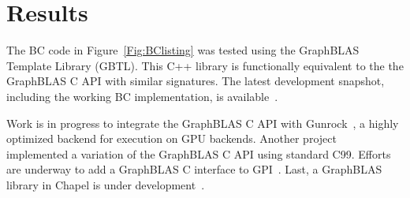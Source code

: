 \section{Results}
\label{sec:results}

The BC code in Figure~\ref{Fig:BClisting} 
was tested using the GraphBLAS Template Library (GBTL)\cite{gbtl-cuda16}. This 
C++ library is functionally equivalent to the the GraphBLAS C
API with similar signatures.  The latest development snapshot, 
including the working BC implementation, is available~\cite{gbtl-github}. 

Work is in progress to integrate the GraphBLAS C API 
with Gunrock~\cite{topc17}, a highly optimized backend for execution 
on GPU backends.  Another project~\cite{cook} implemented a variation
of the GraphBLAS C API using standard C99.
Efforts are underway to add a GraphBLAS C interface to GPI~\cite{gpi2016}.
Last, a GraphBLAS library in Chapel is under development~\cite{chiuw17}.

